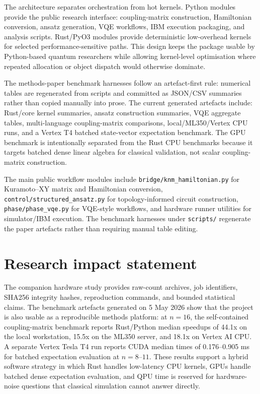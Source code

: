 \documentclass[11pt]{article}
\begin{document}
The architecture separates orchestration from hot kernels. Python modules
provide the public research interface: coupling-matrix construction,
Hamiltonian conversion, ansatz generation, VQE workflows, IBM execution
packaging, and analysis scripts. Rust/PyO3 modules provide deterministic
low-overhead kernels for selected performance-sensitive paths. This design
keeps the package usable by Python-based quantum researchers while allowing
kernel-level optimisation where repeated allocation or object dispatch would
otherwise dominate.

The methods-paper benchmark harnesses follow an artefact-first rule: numerical
tables are regenerated from scripts and committed as JSON/CSV summaries rather
than copied manually into prose. The current generated artefacts include:
Rust/core kernel summaries, ansatz construction summaries, VQE aggregate
tables, multi-language coupling-matrix comparisons, local/ML350/Vertex CPU
runs, and a Vertex T4 batched state-vector expectation benchmark. The GPU
benchmark is intentionally separated from the Rust CPU benchmarks because it
targets batched dense linear algebra for classical validation, not scalar
coupling-matrix construction.

The main public workflow modules include \texttt{bridge/knm\_hamiltonian.py}
for Kuramoto--XY matrix and Hamiltonian conversion,
\texttt{control/structured\_ansatz.py} for topology-informed circuit
construction, \texttt{phase/phase\_vqe.py} for VQE-style workflows, and
hardware runner utilities for simulator/IBM execution. The benchmark harnesses
under \texttt{scripts/} regenerate the paper artefacts rather than requiring
manual table editing.

\section*{Research impact statement}

The companion hardware study provides raw-count archives, job identifiers,
SHA256 integrity hashes, reproduction commands, and bounded statistical claims.
The benchmark artefacts generated on 5 May 2026 show that the project is also
usable as a reproducible methods platform: at $n=16$, the self-contained
coupling-matrix benchmark reports Rust/Python median speedups of 44.1x on the
local workstation, 15.5x on the ML350 server, and 18.1x on Vertex AI CPU. A
separate Vertex Tesla T4 run reports CUDA median times of 0.176--0.905 ms for
batched expectation evaluation at $n=8$--$11$. These results support a hybrid
software strategy in which Rust handles low-latency CPU kernels, GPUs handle
batched dense expectation evaluation, and QPU time is reserved for
hardware-noise questions that classical simulation cannot answer directly.
\end{document}
